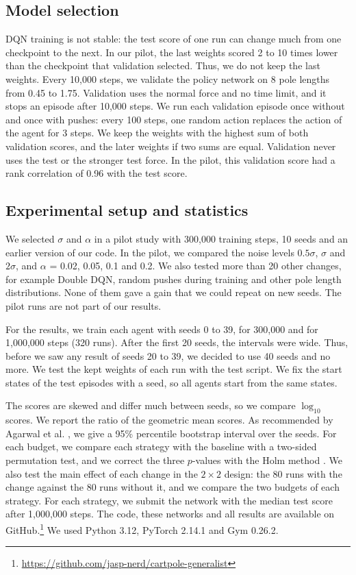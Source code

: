 \documentclass[sigconf]{acmart}
\begin{document}
\subsection{Model selection}
DQN training is not stable: the test score of one run can change much from one checkpoint to the next. In our pilot, the last weights scored 2 to 10 times lower than the checkpoint that validation selected. Thus, we do not keep the last weights. Every 10{,}000 steps, we validate the policy network on 8 pole lengths from 0.45 to 1.75. Validation uses the normal force and no time limit, and it stops an episode after 10{,}000 steps. We run each validation episode once without and once with pushes: every 100 steps, one random action replaces the action of the agent for 3 steps. We keep the weights with the highest sum of both validation scores, and the later weights if two sums are equal. Validation never uses the test or the stronger test force. In the pilot, this validation score had a rank correlation of 0.96 with the test score.

\subsection{Experimental setup and statistics}
We selected $\sigma$ and $\alpha$ in a pilot study with 300{,}000 training steps, 10 seeds and an earlier version of our code. In the pilot, we compared the noise levels $0.5\sigma$, $\sigma$ and $2\sigma$, and $\alpha$ = 0.02, 0.05, 0.1 and 0.2. We also tested more than 20 other changes, for example Double DQN, random pushes during training and other pole length distributions. None of them gave a gain that we could repeat on new seeds. The pilot runs are not part of our results.

For the results, we train each agent with seeds 0 to 39, for 300{,}000 and for 1{,}000{,}000 steps (320 runs). After the first 20 seeds, the intervals were wide. Thus, before we saw any result of seeds 20 to 39, we decided to use 40 seeds and no more. We test the kept weights of each run with the test script. We fix the start states of the test episodes with a seed, so all agents start from the same states.

The scores are skewed and differ much between seeds, so we compare $\log_{10}$ scores. We report the ratio of the geometric mean scores. As recommended by Agarwal et al. \cite{agarwal2021deep}, we give a 95\% percentile bootstrap interval over the seeds. For each budget, we compare each strategy with the baseline with a two-sided permutation test, and we correct the three $p$-values with the Holm method \cite{holm1979simple}. We also test the main effect of each change in the $2\times2$ design: the 80 runs with the change against the 80 runs without it, and we compare the two budgets of each strategy. For each strategy, we submit the network with the median test score after 1{,}000{,}000 steps. The code, these networks and all results are available on GitHub.\footnote{\url{https://github.com/jasp-nerd/cartpole-generalist}} We used Python 3.12, PyTorch 2.14.1 and Gym 0.26.2.
\end{document}
